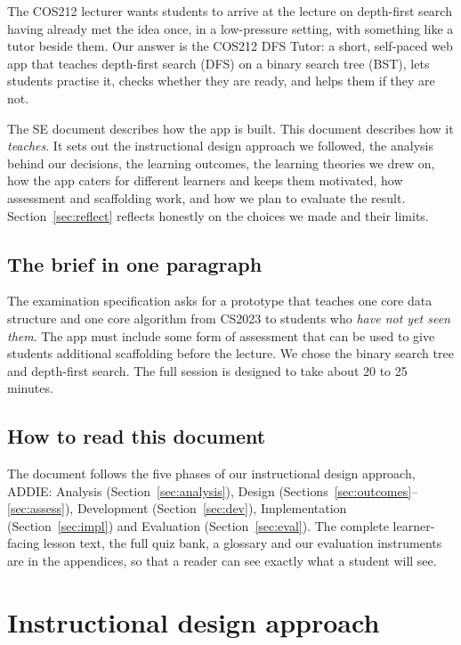 \documentclass[11pt,a4paper]{article}
\begin{document}
The COS212 lecturer wants students to arrive at the lecture on depth-first search having already
met the idea once, in a low-pressure setting, with something like a tutor beside them. Our answer
is the COS212 DFS Tutor: a short, self-paced web app that teaches depth-first search (DFS) on a
binary search tree (BST), lets students practise it, checks whether they are ready, and helps them
if they are not.

The SE document describes how the app is built. This document describes how it \emph{teaches}.
It sets out the instructional design approach we followed, the analysis behind our decisions, the
learning outcomes, the learning theories we drew on, how the app caters for different learners and
keeps them motivated, how assessment and scaffolding work, and how we plan to evaluate the result.
Section~\ref{sec:reflect} reflects honestly on the choices we made and their limits.

\subsection{The brief in one paragraph}

The examination specification asks for a prototype that teaches one core data structure and one
core algorithm from CS2023 \cite{cs2023} to students who \emph{have not yet seen them}. The app must
include some form of assessment that can be used to give students additional scaffolding before
the lecture. We chose the binary search tree and depth-first search. The full session is designed
to take about 20 to 25 minutes.

\subsection{How to read this document}

The document follows the five phases of our instructional design approach, ADDIE: Analysis
(Section~\ref{sec:analysis}), Design (Sections~\ref{sec:outcomes}--\ref{sec:assess}),
Development (Section~\ref{sec:dev}), Implementation (Section~\ref{sec:impl}) and Evaluation
(Section~\ref{sec:eval}). The complete learner-facing lesson text, the full quiz bank, a glossary
and our evaluation instruments are in the appendices, so that a reader can see exactly what a
student will see.

\section{Instructional design approach}
\label{sec:approach}
\end{document}

